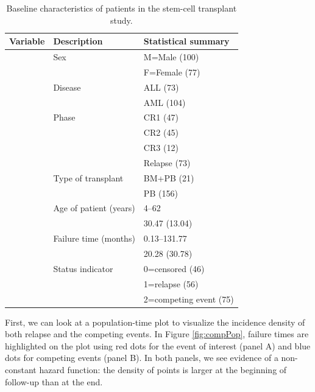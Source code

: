 \documentclass[
]{jss}
\begin{document}
\begin{CodeChunk}
\begin{table}

\caption{\label{tab:table1bmtcrr}Baseline characteristics of patients in the stem-cell transplant study.}
\centering
\begin{tabular}[t]{lll}
\toprule
Variable & Description & Statistical summary\\
\midrule
\code{Sex} & Sex & M=Male (100)\\
 &  & F=Female (77)\\
\code{D} & Disease & ALL (73)\\
 &  & AML (104)\\
\code{Phase} & Phase & CR1 (47)\\
\addlinespace
 &  & CR2 (45)\\
 &  & CR3 (12)\\
 &  & Relapse (73)\\
\code{Source} & Type of transplant & BM+PB (21)\\
 &  & PB (156)\\
\addlinespace
\code{Age} & Age of patient (years) & 4--62\\
 &  & 30.47 (13.04)\\
\code{ftime} & Failure time (months) & 0.13--131.77\\
 &  & 20.28 (30.78)\\
\code{Status} & Status indicator & 0=censored (46)\\
\addlinespace
 &  & 1=relapse (56)\\
 &  & 2=competing event (75)\\
\bottomrule
\end{tabular}
\end{table}

\end{CodeChunk}

First, we can look at a population-time plot to visualize the incidence
density of both relapse and the competing events. In Figure
\ref{fig:compPop}, failure times are highlighted on the plot using red
dots for the event of interest (panel A) and blue dots for competing
events (panel B). In both panels, we see evidence of a non-constant
hazard function: the density of points is larger at the beginning of
follow-up than at the end.
\end{document}
